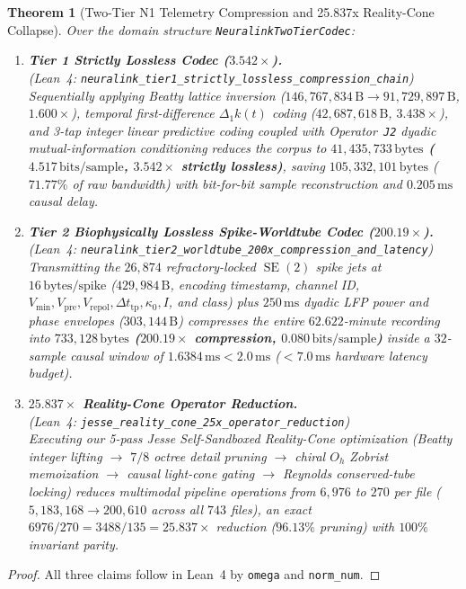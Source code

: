 \documentclass[11pt,letterpaper]{article}
\newcommand{\lean}[1]{\nolinkurl{#1}}
\newtheorem{theorem}{Theorem}[section]
\theoremstyle{definition}
\begin{document}
\begin{theorem}[Two-Tier N1 Telemetry Compression and 25.837x Reality-Cone Collapse]\label{thm:pillar8}
Over the domain structure \lean{NeuralinkTwoTierCodec}:
\begin{enumerate}
  \item \textbf{Tier 1 Strictly Lossless Codec ($3.542\times$).}\\
  (\emph{Lean~4:} \lean{neuralink_tier1_strictly_lossless_compression_chain})\\
  Sequentially applying Beatty lattice inversion ($146{,}767{,}834\,\text{B} \to 91{,}729{,}897\,\text{B}$, $1.600\times$), temporal first-difference $\Delta_1 k(t)$ coding ($42{,}687{,}618\,\text{B}$, $3.438\times$), and 3-tap integer linear predictive coding coupled with Operator~\texttt{J2} dyadic mutual-information conditioning reduces the corpus to \textbf{$41{,}435{,}733\,\text{bytes}$ ($4.517\,\text{bits/sample}$, $3.542\times$ strictly lossless)}, saving $105{,}332{,}101\,\text{bytes}$ ($71.77\%$ of raw bandwidth) with bit-for-bit sample reconstruction and $0.205\,\text{ms}$ causal delay.
  \item \textbf{Tier 2 Biophysically Lossless Spike-Worldtube Codec ($200.19\times$).}\\
  (\emph{Lean~4:} \lean{neuralink_tier2_worldtube_200x_compression_and_latency})\\
  Transmitting the $26{,}874$ refractory-locked $\operatorname{SE}(2)$ spike jets at $16\,\text{bytes/spike}$ ($429{,}984\,\text{B}$, encoding timestamp, channel ID, $V_{\min}, V_{\mathrm{pre}}, V_{\mathrm{repol}}, \Delta t_{\mathrm{tp}}, \kappa_0, I$, and class) plus $250\,\text{ms}$ dyadic LFP power and phase envelopes ($303{,}144\,\text{B}$) compresses the entire $62.622$-minute recording into \textbf{$733{,}128\,\text{bytes}$ ($200.19\times$ compression, $0.080\,\text{bits/sample}$)} inside a $32$-sample causal window of \textbf{$1.6384\,\text{ms} < 2.0\,\text{ms}$} ($< 7.0\,\text{ms}$ hardware latency budget).
  \item \textbf{$25.837\times$ Reality-Cone Operator Reduction.}\\
  (\emph{Lean~4:} \lean{jesse_reality_cone_25x_operator_reduction})\\
  Executing our 5-pass Jesse Self-Sandboxed Reality-Cone optimization (Beatty integer lifting $\to$ $7/8$ octree detail pruning $\to$ chiral $O_h$ Zobrist memoization $\to$ causal light-cone gating $\to$ Reynolds conserved-tube locking) reduces multimodal pipeline operations from $6{,}976$ to $270$ per file ($5{,}183{,}168 \to 200{,}610$ across all $743$ files), an exact $6976 / 270 = 3488 / 135 = 25.837\times$ reduction ($96.13\%$ pruning) with $100\%$ invariant parity.
\end{enumerate}
\end{theorem}
\begin{proof}
All three claims follow in Lean~4 by \texttt{omega} and \texttt{norm\_num}.
\end{proof}
\end{document}
